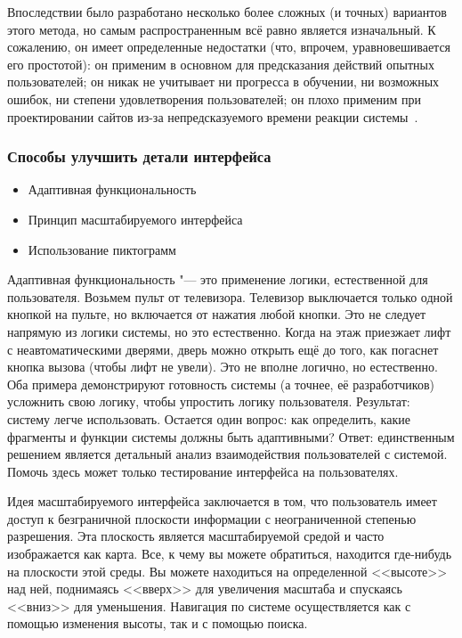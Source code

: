 \documentclass{../industrial-development}
\begin{document}
Впоследствии было разработано несколько более сложных (и точных) вариантов этого метода, но самым распространенным всё равно является изначальный. К сожалению, он имеет определенные недостатки (что, впрочем, уравновешивается его простотой): он применим в основном для предсказания действий опытных пользователей; он никак не учитывает ни прогресса в обучении, ни возможных ошибок, ни степени удовлетворения пользователей; он плохо применим при проектировании сайтов из-за непредсказуемого времени реакции системы~\cite[с.~120--121]{Golovach}.

\begin{frame} \frametitle{Способы улучшить детали интерфейса}
  \begin{itemize}
   \item Адаптивная функциональность
   \item Принцип масштабируемого интерфейса
   \item Использование пиктограмм
  \end{itemize}
\end{frame}

\lecturenotes

Адаптивная функциональность "--- это применение логики, естественной для пользователя. Возьмем пульт от телевизора. Телевизор выключается только одной кнопкой на пульте, но включается от нажатия любой кнопки. Это не следует напрямую из логики системы, но это естественно. Когда на этаж приезжает лифт с неавтоматическими дверями, дверь можно открыть ещё до того, как погаснет кнопка вызова (чтобы лифт не увели). Это не вполне логично, но естественно. Оба примера демонстрируют готовность системы (а точнее, её разработчиков) усложнить свою логику, чтобы упростить логику пользователя. Результат: систему легче использовать. Остается один вопрос: как определить, какие фрагменты и функции системы должны быть адаптивными? Ответ: единственным решением является детальный анализ взаимодействия пользователей с системой. Помочь здесь может только тестирование интерфейса на пользователях.~\cite[с.~124]{Golovach}

Идея масштабируемого интерфейса заключается в том, что пользователь имеет доступ к безграничной плоскости информации с неограниченной степенью разрешения. Эта плоскость является масштабируемой средой и часто изображается как карта. Все, к чему вы можете обратиться, находится где-нибудь на плоскости этой среды. Вы можете находиться на определенной <<высоте>> над ней, поднимаясь <<вверх>> для увеличения масштаба и спускаясь <<вниз>> для уменьшения. Навигация по системе осуществляется как с помощью изменения высоты, так и с помощью поиска.
\end{document}
